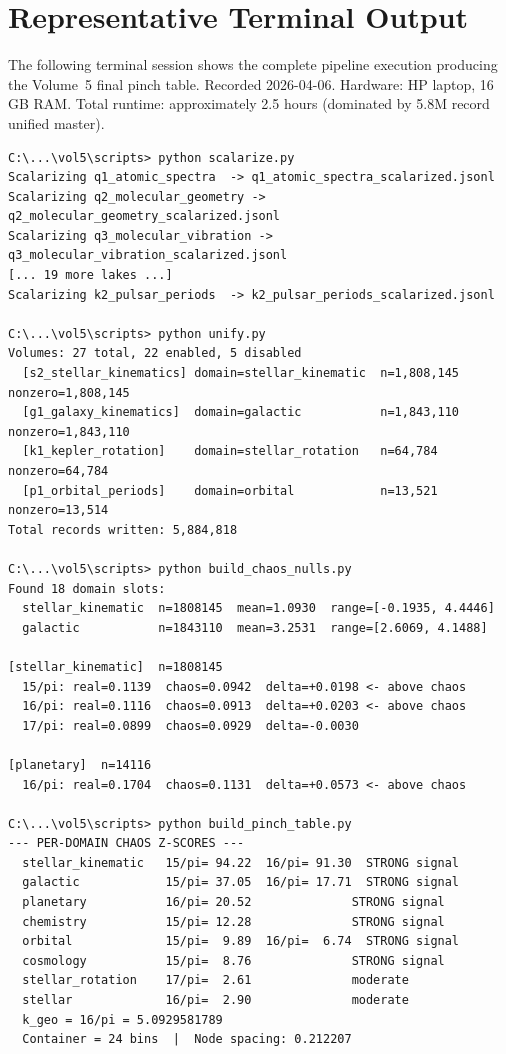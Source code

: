 \documentclass[11pt, letterpaper, openany]{book}
\begin{document}
\section{Representative Terminal Output}

The following terminal session shows the complete pipeline execution producing the
Vol\-ume~5 final pinch table. Recorded 2026-04-06. Hardware: HP laptop, 16 GB RAM.
Total runtime: approximately 2.5 hours (dominated by 5.8M record unified master).

\begin{lstlisting}[style=terminal]
C:\...\vol5\scripts> python scalarize.py
Scalarizing q1_atomic_spectra  -> q1_atomic_spectra_scalarized.jsonl
Scalarizing q2_molecular_geometry -> q2_molecular_geometry_scalarized.jsonl
Scalarizing q3_molecular_vibration -> q3_molecular_vibration_scalarized.jsonl
[... 19 more lakes ...]
Scalarizing k2_pulsar_periods  -> k2_pulsar_periods_scalarized.jsonl

C:\...\vol5\scripts> python unify.py
Volumes: 27 total, 22 enabled, 5 disabled
  [s2_stellar_kinematics] domain=stellar_kinematic  n=1,808,145  nonzero=1,808,145
  [g1_galaxy_kinematics]  domain=galactic           n=1,843,110  nonzero=1,843,110
  [k1_kepler_rotation]    domain=stellar_rotation   n=64,784     nonzero=64,784
  [p1_orbital_periods]    domain=orbital            n=13,521     nonzero=13,514
Total records written: 5,884,818

C:\...\vol5\scripts> python build_chaos_nulls.py
Found 18 domain slots:
  stellar_kinematic  n=1808145  mean=1.0930  range=[-0.1935, 4.4446]
  galactic           n=1843110  mean=3.2531  range=[2.6069, 4.1488]

[stellar_kinematic]  n=1808145
  15/pi: real=0.1139  chaos=0.0942  delta=+0.0198 <- above chaos
  16/pi: real=0.1116  chaos=0.0913  delta=+0.0203 <- above chaos
  17/pi: real=0.0899  chaos=0.0929  delta=-0.0030

[planetary]  n=14116
  16/pi: real=0.1704  chaos=0.1131  delta=+0.0573 <- above chaos

C:\...\vol5\scripts> python build_pinch_table.py
--- PER-DOMAIN CHAOS Z-SCORES ---
  stellar_kinematic   15/pi= 94.22  16/pi= 91.30  STRONG signal
  galactic            15/pi= 37.05  16/pi= 17.71  STRONG signal
  planetary           16/pi= 20.52              STRONG signal
  chemistry           15/pi= 12.28              STRONG signal
  orbital             15/pi=  9.89  16/pi=  6.74  STRONG signal
  cosmology           15/pi=  8.76              STRONG signal
  stellar_rotation    17/pi=  2.61              moderate
  stellar             16/pi=  2.90              moderate
  k_geo = 16/pi = 5.0929581789
  Container = 24 bins  |  Node spacing: 0.212207
\end{lstlisting}
\end{document}

